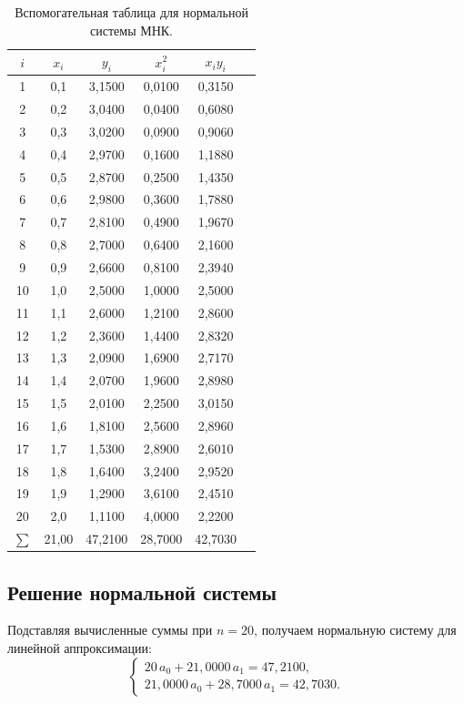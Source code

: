 \begin{table}[h!]
\centering
\small
\begin{tabular}{|c|c|c|c|c|c|}
\hline
$i$ & $x_i$ & $y_i$ & $x_i^2$ & $x_i y_i$ \\
\hline
1  & 0,1 & 3,1500 & 0,0100 & 0,3150 \\
2  & 0,2 & 3,0400 & 0,0400 & 0,6080 \\
3  & 0,3 & 3,0200 & 0,0900 & 0,9060 \\
4  & 0,4 & 2,9700 & 0,1600 & 1,1880 \\
5  & 0,5 & 2,8700 & 0,2500 & 1,4350 \\
6  & 0,6 & 2,9800 & 0,3600 & 1,7880 \\
7  & 0,7 & 2,8100 & 0,4900 & 1,9670 \\
8  & 0,8 & 2,7000 & 0,6400 & 2,1600 \\
9  & 0,9 & 2,6600 & 0,8100 & 2,3940 \\
10 & 1,0 & 2,5000 & 1,0000 & 2,5000 \\
11 & 1,1 & 2,6000 & 1,2100 & 2,8600 \\
12 & 1,2 & 2,3600 & 1,4400 & 2,8320 \\
13 & 1,3 & 2,0900 & 1,6900 & 2,7170 \\
14 & 1,4 & 2,0700 & 1,9600 & 2,8980 \\
15 & 1,5 & 2,0100 & 2,2500 & 3,0150 \\
16 & 1,6 & 1,8100 & 2,5600 & 2,8960 \\
17 & 1,7 & 1,5300 & 2,8900 & 2,6010 \\
18 & 1,8 & 1,6400 & 3,2400 & 2,9520 \\
19 & 1,9 & 1,2900 & 3,6100 & 2,4510 \\
20 & 2,0 & 1,1100 & 4,0000 & 2,2200 \\
\hline
$\sum$ & 21,00 & 47,2100 & 28,7000 & 42,7030 \\
\hline
\end{tabular}
\caption{Вспомогательная таблица для нормальной системы МНК.}
\label{tab:aux}
\end{table}

\subsection{Решение нормальной системы}

Подставляя вычисленные суммы при $n = 20$, получаем нормальную систему для
линейной аппроксимации:
\[
\begin{cases}
20\,a_0 + 21{,}0000\,a_1 = 47{,}2100, \\
21{,}0000\,a_0 + 28{,}7000\,a_1 = 42{,}7030.
\end{cases}
\]

